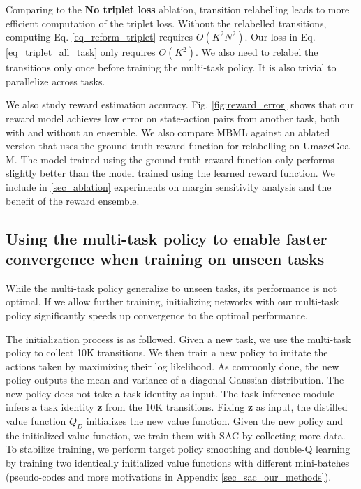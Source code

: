 Comparing to the \textbf{No triplet loss} ablation, transition relabelling leads to more efficient computation of the triplet loss. Without the relabelled transitions, computing Eq. \ref{eq_reform_triplet} requires $O(K^2 N^2)$. Our loss in Eq. \ref{eq_triplet_all_task} only requires $O(K^2)$. We also need to relabel the transitions only once before training the multi-task policy. It is also trivial to parallelize across tasks.

We also study reward estimation accuracy. Fig. \ref{fig:reward_error} shows that our reward model achieves low error on state-action pairs from another task, both with and without an ensemble. We also compare MBML against an ablated version that uses the ground truth reward function for relabelling on UmazeGoal-M. The model trained using the ground truth reward function only performs slightly better than the model trained using the learned reward function. We include in \autoref{sec_ablation} experiments on margin sensitivity analysis and the benefit of the reward ensemble.

\subsection{Using the multi-task policy to enable faster convergence when training on unseen tasks}\label{sec_exp_init_sac}

While the multi-task policy generalize to unseen tasks, its performance is not optimal. If we allow further training,
initializing networks with our multi-task policy significantly speeds up convergence to the optimal performance.

The initialization process is as followed. Given a new task, we use the multi-task policy to collect 10K transitions.
We then train a new policy to imitate the actions taken by maximizing their log likelihood. As commonly done, the new policy outputs the mean and variance of a diagonal Gaussian distribution. The new policy does not take a task identity as input. The task inference module infers a task identity {\bf z} from the 10K transitions. Fixing {\bf z} as input, the distilled value function $Q_D$ initializes the new value function. Given the new policy and the initialized value function,
we train them with SAC by collecting more data.
To stabilize training, we perform target policy smoothing \cite{TD3} and double-Q learning \cite{van2016deep} by training two identically initialized value functions with different mini-batches (pseudo-codes and more motivations in Appendix \ref{sec_sac_our_methods}).

